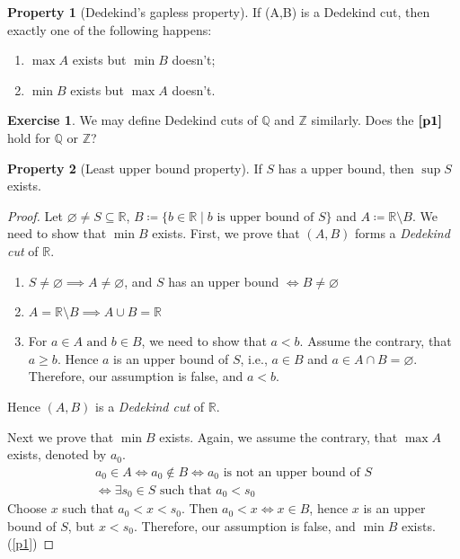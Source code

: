 \documentclass{article}
\theoremstyle{definition}
\newtheorem{property}{Property}
\newtheorem{exercise}{Exercise}
\begin{document}
\begin{property}[Dedekind's gapless property]\label{p1}
    If (A,B) is a Dedekind cut, then exactly one of the following happens:
    \begin{enumerate}
        \item $\max A$ exists but $\min B$ doesn't;
        \item $\min B$ exists but $\max A$ doesn't.
    \end{enumerate}
\end{property}

\begin{exercise}
    We may define Dedekind cuts of $\mathbb{Q}$ and $\mathbb{Z}$ similarly.
    Does the $\textbf{\autoref{p1}}$ hold for $\mathbb{Q}$ or $\mathbb{Z}$?
\end{exercise}

\begin{property}[Least upper bound property]
    If $S$ has a upper bound, then $\sup S$ exists.
\end{property}

\begin{proof}
    Let $\varnothing \neq S \subseteq \mathbb{R}$, $B\coloneqq\{b\in\mathbb{R}\mid b \text{ is upper bound of } S\}$ and $A\coloneqq\mathbb{R} \setminus B.$
    We need to show that $\min B$ exists. First, we prove that $(A,B)$ forms a \emph{Dedekind cut} of $\mathbb{R}$.
    \begin{enumerate}
        \item $S \neq \varnothing \implies A \neq \varnothing$, and $S$ has an upper bound $\iff B  \neq \varnothing$
        \item $A=\mathbb{R}\setminus B \implies A\cup B = \mathbb{R}$
        \item For $a\in A \text{ and } b\in B$, we need to show that $a<b$. 
            Assume the contrary, that $a\geq b$. Hence $a$ is an upper bound of $S$, i.e., $a\in B$ and
            $a\in A\cap B = \varnothing$. Therefore, our assumption is false, and $a < b$.
    \end{enumerate}
    Hence $(A,B)$ is a \emph{Dedekind cut} of $\mathbb{R}$.

    Next we prove that $\min B$ exists.
    Again, we assume the contrary, that $\max A$ exists, denoted by $a_0$.
    \begin{gather*}
        a_0\in A \iff a_0 \notin B \iff a_0 \text{ is not an upper bound of } S \\
        \iff \exists s_0 \in S \text{ such that } a_0<s_0
    \end{gather*}
    Choose $x$ such that $a_0<x<s_0$. Then $a_0<x \iff x\in B$, hence $x$ is an upper bound of $S$, but $x < s_0$.
    Therefore, our assumption is false, and $\min B$ exists.(\autoref{p1})
\end{proof}
\end{document}
